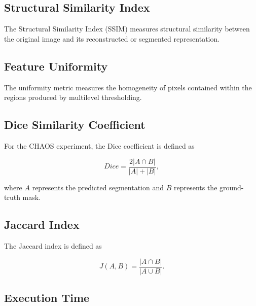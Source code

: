 \documentclass[review]{elsarticle}
\begin{document}


\subsection{Structural Similarity Index}

The Structural Similarity Index (SSIM) measures structural similarity
between the original image and its reconstructed or segmented
representation.



\subsection{Feature Uniformity}


The uniformity metric measures the homogeneity of pixels contained
within the regions produced by multilevel thresholding.



\subsection{Dice Similarity Coefficient}

For the CHAOS experiment, the Dice coefficient is defined as

\begin{equation}
Dice =
\frac{2|A \cap B|}
{|A|+|B|},
\end{equation}

where $A$ represents the predicted segmentation and $B$ represents the
ground-truth mask.

\subsection{Jaccard Index}

The Jaccard index is defined as

\begin{equation}
J(A,B)
=
\frac{|A\cap B|}
{|A\cup B|}.
\end{equation}


\subsection{Execution Time}
\end{document}
